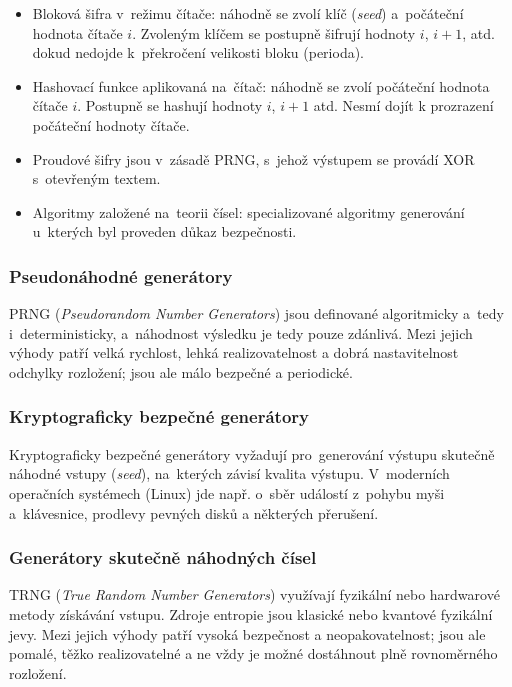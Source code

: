 \begin{itemize}
    \item
        Bloková šifra v~režimu čítače: náhodně se zvolí klíč (\emph{seed}) a~počáteční hodnota čítače $i$.
        Zvoleným klíčem se postupně šifrují hodnoty $i$, $i+1$, atd. dokud nedojde k~překročení velikosti bloku (perioda).
    \item
        Hashovací funkce aplikovaná na~čítač: náhodně se zvolí počáteční hodnota čítače $i$.
        Postupně se hashují hodnoty $i$, $i+1$ atd.
        Nesmí dojít k prozrazení počáteční hodnoty čítače.
    \item
        Proudové šifry jsou v~zásadě PRNG, s~jehož výstupem se provádí XOR s~otevřeným textem.
    \item
        Algoritmy založené na~teorii čísel: specializované algoritmy generování u~kterých byl proveden důkaz bezpečnosti.
\end{itemize}


\subsubsection{Pseudonáhodné generátory}

PRNG (\emph{Pseudorandom Number Generators}) jsou definované algoritmicky a~tedy i~deterministicky, a~náhodnost výsledku je tedy pouze zdánlivá.
Mezi jejich výhody patří velká rychlost, lehká realizovatelnost a dobrá nastavitelnost odchylky rozložení; jsou ale málo bezpečné a periodické.


\subsubsection{Kryptograficky bezpečné generátory}

Kryptograficky bezpečné generátory vyžadují pro~generování výstupu skutečně náhodné vstupy (\emph{seed}), na~kterých závisí kvalita výstupu.
V~moderních operačních systémech (Linux) jde např. o~sběr událostí z~pohybu myši a~klávesnice, prodlevy pevných disků a některých přerušení.


\subsubsection{Generátory skutečně náhodných čísel}

TRNG (\emph{True Random Number Generators}) využívají fyzikální nebo hardwarové metody získávání vstupu.
Zdroje entropie jsou klasické nebo kvantové fyzikální jevy.
Mezi jejich výhody patří vysoká bezpečnost a neopakovatelnost; jsou ale pomalé, těžko realizovatelné a ne vždy je možné dostáhnout plně rovnoměrného rozložení.



